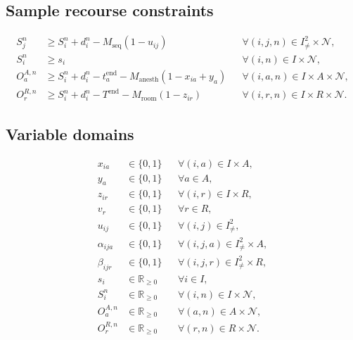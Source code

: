 \documentclass[11pt,a4paper]{article}
\begin{document}
\subsection*{Sample recourse constraints}
\begin{align}
S_j^n&\geq S_i^n+d_i^n-M_{\mathrm{seq}}(1-u_{ij})
&&\forall (i,j,n)\in I^2_{\ne}\times\mathcal{N},\\
S_i^n&\geq s_i
&&\forall (i,n)\in I\times\mathcal{N},\\
O_a^{A,n}&\geq S_i^n+d_i^n-t_a^{\mathrm{end}}
-M_{\mathrm{anesth}}(1-x_{ia}+y_a)
&&\forall (i,a,n)\in I\times A\times\mathcal{N},\\
O_r^{R,n}&\geq S_i^n+d_i^n-T^{\mathrm{end}}
-M_{\mathrm{room}}(1-z_{ir})
&&\forall (i,r,n)\in I\times R\times\mathcal{N}.
\end{align}

\subsection*{Variable domains}
\begin{align}
x_{ia}&\in\{0,1\} &&\forall (i,a)\in I\times A,\\
y_a&\in\{0,1\} &&\forall a\in A,\\
z_{ir}&\in\{0,1\} &&\forall (i,r)\in I\times R,\\
v_r&\in\{0,1\} &&\forall r\in R,\\
u_{ij}&\in\{0,1\} &&\forall (i,j)\in I^2_{\ne},\\
\alpha_{ija}&\in\{0,1\} &&\forall (i,j,a)\in I^2_{\ne}\times A,\\
\beta_{ijr}&\in\{0,1\} &&\forall (i,j,r)\in I^2_{\ne}\times R,\\
s_i&\in\mathbb{R}_{\geq0} &&\forall i\in I,\\
S_i^n&\in\mathbb{R}_{\geq0} &&\forall (i,n)\in I\times\mathcal{N},\\
O_a^{A,n}&\in\mathbb{R}_{\geq0} &&\forall (a,n)\in A\times\mathcal{N},\\
O_r^{R,n}&\in\mathbb{R}_{\geq0} &&\forall (r,n)\in R\times\mathcal{N}.
\end{align}
\end{document}
